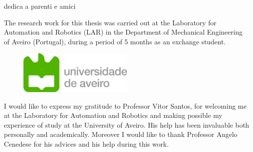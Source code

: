 
dedica a parenti e amici

The research work for this thesis was carried out at the Laboratory for Automation and Robotics (LAR) in the Department of Mechanical Engineering of Aveiro (Portugal), during a period of 5 months as an exchange student.
\begin{figure}[!h]
	\centering
	\includegraphics[width=0.50\textwidth]{./figure/logo_ua.png}
	\label{fig:logo_ua}
\end{figure}

I would like to express my gratitude to Professor Vitor Santos, for welcoming me at the Laboratory for Automation and Robotics and making possible my experience of study at the University of Aveiro. His help has been invaluable both personally and academically. Moreover I would like to thank Professor Angelo Cenedese for his advices and his help during this work.


